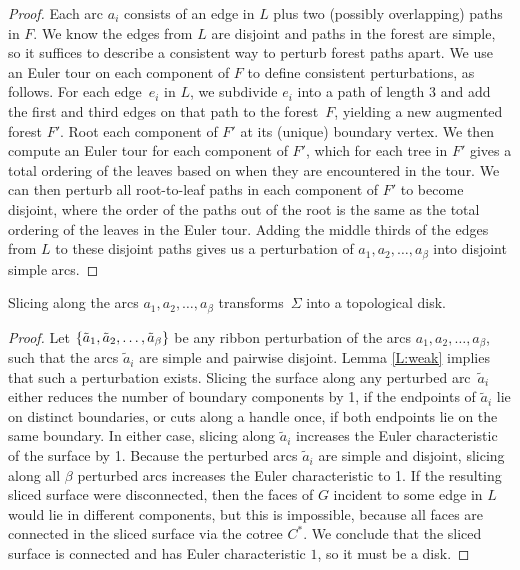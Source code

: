 \documentclass[letterpaper,review]{siamart190516}
\def\enote#1{\textcolor{magenta}{Erin: #1}}
\begin{document}
\begin{proof} 
Each arc $a_i$ consists of an edge in $L$ plus two (possibly overlapping) paths in $F$.  We know the edges from $L$ are disjoint and paths in the forest are simple, so it suffices to describe a consistent way to perturb forest paths apart.  
We use an Euler tour on each component of $F$ to define consistent perturbations, as follows.
For each edge~$e_i$ in $L$, we subdivide $e_i$ into a path of length $3$ and add the first and third edges on that path to the forest~$F$, yielding a new augmented forest $F'$.  Root each component of $F'$ at its (unique) boundary vertex.
We then compute an Euler tour for each component of $F'$, which for each tree in $F'$ gives a total ordering of the leaves based on when they are encountered in the tour.
We can then perturb all root-to-leaf paths in each component of $F'$ to become disjoint,  where the order of the paths out of the root is the same as the total ordering of the leaves in the Euler tour.
Adding the middle thirds of the edges from $L$ to these disjoint paths gives us a perturbation of $a_1, a_2, \dots, a_\beta$ into disjoint simple arcs.
\end{proof}

\begin{lemma}
\label{lem:disk}
Slicing along the arcs $a_1, a_2, \dots, a_\beta$ transforms~$\Sigma$ into a topological disk.
\end{lemma}

\begin{proof}
Let $\{ \tilde{a}_1, \tilde{a}_2, \dots, \tilde{a}_\beta \}$ be any ribbon perturbation of the arcs $a_1, a_2, \dots, a_\beta$, such that the arcs $\tilde{a}_i$ are simple and pairwise disjoint.  Lemma \ref{L:weak} implies that such a perturbation exists.  Slicing the surface along any perturbed arc~$\tilde{a}_i$ either reduces the number of boundary components by 1, if the endpoints of $\tilde{a}_i$ lie on distinct boundaries, or cuts along a handle once, if both endpoints lie on the same boundary.  In either case, slicing along $\tilde{a}_i$ increases the Euler characteristic of the surface by 1.  Because the perturbed arcs $\tilde{a}_i$ are simple and disjoint, slicing along all $\beta$ perturbed arcs increases the Euler characteristic to 1.  If the resulting sliced surface were disconnected, then the faces of $G$ incident to some edge in $L$ would lie in different components, but this is impossible, because all faces are connected in the sliced surface via the cotree $C^*$.  We conclude that the sliced surface is connected and has Euler characteristic $1$, so it must be a disk.  %
\end{proof}
\end{document}
